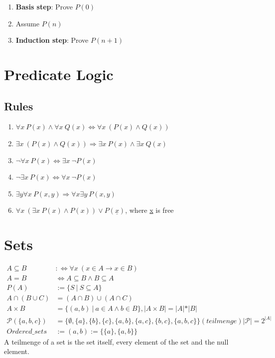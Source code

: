 \documentclass[11pt]{article}
\begin{document}
\begin{enumerate}
	\item \textbf{Basis step}: Prove $P(0)$
	\item Assume $P(n)$
	\item \textbf{Induction step}: Prove $P(n + 1)$
\end{enumerate}

\section{Predicate Logic}

\subsection{Rules}

\begin{enumerate}[labelindent=16pt,style=multiline,leftmargin=1.5cm, noitemsep]
	\item $\forall x\ P(x) \land \forall x\ Q(x) \Leftrightarrow \forall x\ (P(x) \land Q(x))$
	\item $\exists x\ (P(x) \land Q(x)) \Rightarrow \exists x\ P(x) \land \exists x\ Q(x)$
	\item $\neg\forall x\ P(x) \Leftrightarrow \exists x\ \neg P(x)$
	\item $\neg\exists x\ P(x) \Leftrightarrow \forall x \ \neg P(x)$
	\item $\exists y \forall x\ P(x, y) \Rightarrow \forall x \exists y\ P(x, y)$
	\item $\forall x\ (\exists x\ P(x) \land P(x)) \lor P(\underline{x})$, where \underline{x} is free
\end{enumerate}

\section{Sets}

\begin{equation*}
\begin{split}
	A \subseteq B & :\Leftrightarrow \forall x\ (x \in A \rightarrow x \in B) \\
	A = B & \Leftrightarrow A \subseteq B \land B \subseteq A \\
	P(A) & := \{S\ |\ S \subseteq A\} \\
	A \cap (B \cup C) & = (A \cap B) \cup (A \cap C) \\
	A \times B & = \{(a, b)\ |\ a \in A \land b \in B\} ,|A\times B| = |A|*|B|\\ 
	\mathcal{P}(\{a,b,c\}) & = \{\emptyset, \{a\}, \{b\}, \{c\}, \{a,b\}, \{a,c\}, \{b,c\}, \{a,b,c\}\} (teilmenge) |\mathcal{P}|=2^{|A|}\\
	 Ordered\_sets & := (a,b):=\{\{a\},\{a,b\}\}
\end{split}
\end{equation*}
A teilmenge of a set is the set itself, every element of the set and the null element.
\end{document}
